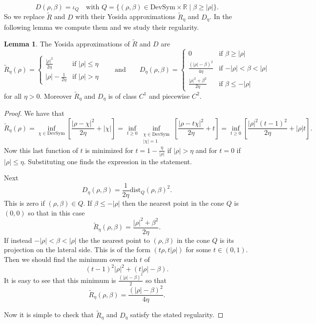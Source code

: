 \documentclass[a4paper,10pt,oneside]{amsbook}
\numberwithin{section}{chapter}
\numberwithin{equation}{chapter}
\theoremstyle{definition}
\newtheorem{lemma}[prop]{Lemma}
\begin{document}
\[
D(\rho,\beta)=\iota_Q\quad\text{with $Q=\{(\rho,\beta)\in\text{DevSym}\times\mathbb{R}\;|\;\beta\ge|\rho|\}$}.
\]
So we replace $\tilde R$ and $D$ with their Yosida approximations $\tilde R_\eta$ and $D_\eta$. In the following lemma we compute them and we study their regularity.
\begin{lemma}
The Yosida approximations of $\tilde R$ and $D$ are
\[
\tilde R_\eta(\rho)
=\begin{cases}
\frac{|\rho|^2}{2\eta} & \text{if $|\rho|\le\eta$} \\
|\rho|-\frac{1}{2\eta} & \text{if $|\rho|>\eta$}
\end{cases}
\qquad\text{and}\qquad
D_\eta(\rho,\beta)
=\begin{cases}
0 & \text{if $\beta\ge|\rho|$} \\
\frac{(|\rho|-\beta)^2}{4\eta} & \text{if $-|\rho|<\beta<|\rho|$} \\
\frac{|\rho|^2+\beta^2}{2\eta} & \text{if $\beta\le-|\rho|$}
\end{cases}
\]
for all $\eta>0$. Moreover $\tilde R_\eta$ and $D_\eta$ is of class $C^1$ and piecewise $C^2$.
\end{lemma}
\begin{proof}
We have that
\[
\tilde R_\eta(\rho)=\inf_{\chi\in\text{DevSym}}\left[\frac{|\rho-\chi|^2}{2\eta}+|\chi|\right]=\inf_{t\ge0}\inf_{\substack{\chi\in\text{DevSym}\\|\chi|=1}}
\left[\frac{|\rho-t\chi|^2}{2\eta}+t\right]=\inf_{t\ge0}\left[\frac{|\rho|^2(t-1)^2}{2\eta}+|\rho|t\right].
\]
Now this last function of $t$ is minimized for $t=1-\frac{\eta}{|\rho|}$ if $|\rho|>\eta$ and for $t=0$ if $|\rho|\le\eta$. Substituting one finds the expression in the statement.

Next
\[
D_\eta(\rho,\beta)=\frac{1}{2\eta}\text{dist}_Q(\rho,\beta)^2.
\]
This is zero if $(\rho,\beta)\in Q$. If $\beta\le-|\rho|$ then the nearest point in the cone $Q$ is $(0,0)$ so that in this case
\[
\tilde R_\eta(\rho,\beta)=\frac{|\rho|^2+\beta^2}{2\eta}.
\]
If instead $-|\rho|<\beta<|\rho|$ the the nearest point to $(\rho,\beta)$ in the cone $Q$ is its projection on the lateral side. This is of the form $(t\rho,t|\rho|)$ for some $t\in(0,1)$. Then we should find the minimum over such $t$ of
\[
(t-1)^2|\rho|^2+(t|\rho|-\beta).
\]
It is easy to see that this minimum is $\frac{(|\rho|-\beta)^2}{2}$ so that
\[
\tilde R_\eta(\rho,\beta)=\frac{(|\rho|-\beta)^2}{4\eta}.
\]

Now it is simple to check that $\tilde R_\eta$ and $D_\eta$ satisfy the stated regularity.
\end{proof}
\end{document}
